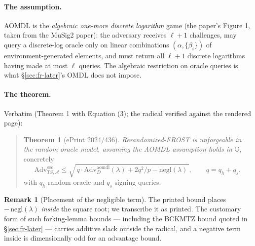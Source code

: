 \documentclass[11pt,a4paper]{article}
\theoremstyle{definition}
\newtheorem{remark}[theorem]{Remark}
\newcommand{\G}{\mathbb{G}}
\begin{document}
\paragraph{The assumption.} AOMDL is the \emph{algebraic one-more
discrete logarithm} game (the paper's Figure 1, taken from the MuSig2
paper): the adversary receives $\ell + 1$ challenges, may query a
discrete-log oracle only on linear combinations
$(\alpha, \{\beta_i\})$ of environment-generated elements, and must
return all $\ell + 1$ discrete logarithms having made at most $\ell$
queries. The algebraic restriction on oracle queries is what
\S\ref{sec:fr-later}'s OMDL does not impose.

\paragraph{The theorem.} Verbatim (Theorem 1 with Equation (3); the
radical verified against the rendered page):

\begin{quotation}
\noindent\textbf{Theorem 1} (ePrint 2024/436). \emph{Rerandomized-FROST
is unforgeable in the random oracle model, assuming the AOMDL assumption
holds in $\G$}, concretely
\begin{equation}\label{eq:fr-rerand-bound}
\mathrm{Adv}^{\mathrm{sec}}_{TS,\mathcal{A}} \le
\sqrt{\, q \cdot \mathrm{Adv}^{\mathrm{aomdl}}_{D}(\lambda)
      + 2 q^2 / p - \mathrm{negl}(\lambda) \,},
\qquad q = q_h + q_s,
\end{equation}
with $q_h$ random-oracle and $q_s$ signing queries.
\end{quotation}

\begin{remark}[Placement of the negligible term]\label{rem:fr-negl}
The printed bound places $-\,\mathrm{negl}(\lambda)$ \emph{inside} the
square root; we transcribe it as printed. The customary form of such
forking-lemma bounds --- including the BCKMTZ bound quoted in
\S\ref{sec:fr-later} --- carries additive slack outside the radical, and
a negative term inside is dimensionally odd for an advantage bound.
\end{remark}
\end{document}
